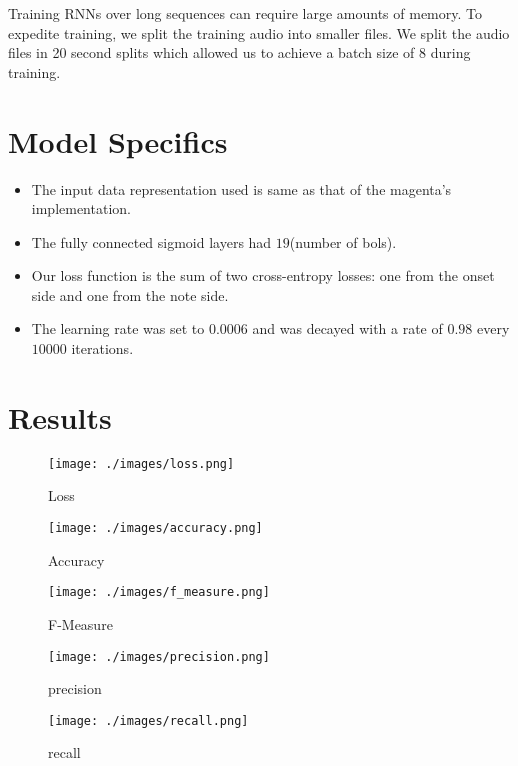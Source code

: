 Training RNNs over long sequences can require large amounts of memory. To expedite training, we split the training audio into smaller files. We split the audio files in 20 second splits which
allowed us to achieve a batch size of 8 during training.



\section*{Model Specifics}
\begin{itemize}
\item The input data representation used is same as that of the magenta’s implementation.
\item The fully connected sigmoid layers had $19$(number of bols).
\item Our loss function is the sum of two cross-entropy losses: one from the onset side and one from the note side.
\item The learning rate was set to $0.0006$ and was decayed with a rate of $0.98$ every $10000$ iterations.
\end{itemize}

\section*{Results}

\begin{figure}[h!]
  \texttt{[image: ./images/loss.png]}
  \caption{Loss}
  \label{}
\end{figure}

\begin{figure}[h!]
  \texttt{[image: ./images/accuracy.png]}
  \caption{Accuracy}
  \label{}
\end{figure}


\begin{figure}[h!]
  \texttt{[image: ./images/f\_measure.png]}
  \caption{F-Measure}
  \label{}
\end{figure}


\begin{figure}[h!]
  \texttt{[image: ./images/precision.png]}
  \caption{precision}
  \label{}
\end{figure}



\begin{figure}[h!]
  \texttt{[image: ./images/recall.png]}
  \caption{recall}
  \label{}
\end{figure}

